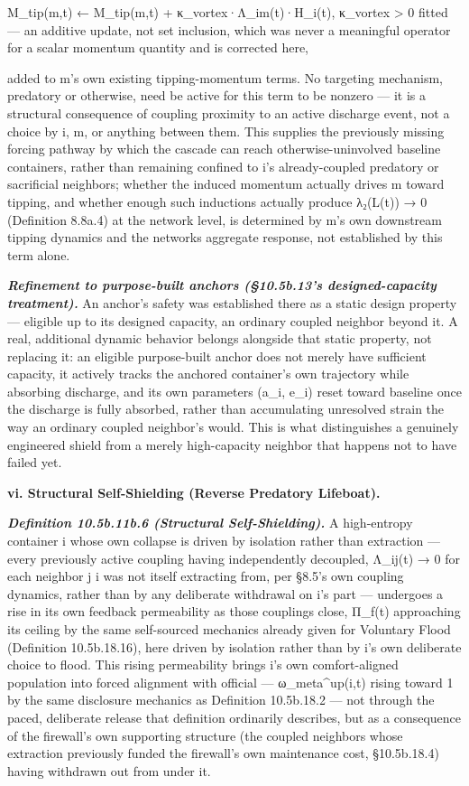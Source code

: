 \documentclass[
]{article}
\begin{document}
M\_tip(m,t) ← M\_tip(m,t) + κ\_vortex·Λ\_im(t)·H\_i(t), κ\_vortex
\textgreater{} 0 fitted --- an additive update, not set inclusion, which
was never a meaningful operator for a scalar momentum quantity and is
corrected here,

added to m's own existing tipping-momentum terms. No targeting
mechanism, predatory or otherwise, need be active for this term to be
nonzero --- it is a structural consequence of coupling proximity to an
active discharge event, not a choice by i, m, or anything between them.
This supplies the previously missing forcing pathway by which the
cascade can reach otherwise-uninvolved baseline containers, rather than
remaining confined to i's already-coupled predatory or sacrificial
neighbors; whether the induced momentum actually drives m toward
tipping, and whether enough such inductions actually produce λ₂(L(t)) →
0 (Definition 8.8a.4) at the network level, is determined by m's own
downstream tipping dynamics and the networks aggregate response, not
established by this term alone.

\emph{\textbf{Refinement to purpose-built anchors (§10.5b.13's
designed-capacity treatment).}} An anchor's safety was established there
as a static design property --- eligible up to its designed capacity, an
ordinary coupled neighbor beyond it. A real, additional dynamic behavior
belongs alongside that static property, not replacing it: an eligible
purpose-built anchor does not merely have sufficient capacity, it
actively tracks the anchored container's own trajectory while absorbing
discharge, and its own parameters (a\_i, e\_i) reset toward baseline
once the discharge is fully absorbed, rather than accumulating
unresolved strain the way an ordinary coupled neighbor's would. This is
what distinguishes a genuinely engineered shield from a merely
high-capacity neighbor that happens not to have failed yet.

\textbf{vi. Structural Self-Shielding (Reverse Predatory Lifeboat).}

\emph{\textbf{Definition 10.5b.11b.6 (Structural Self-Shielding).}} A
high-entropy container i whose own collapse is driven by isolation
rather than extraction  ---  every previously active coupling having
independently decoupled, Λ\_ij(t) → 0 for each neighbor j i was not
itself extracting from, per §8.5's own coupling dynamics, rather than
by any deliberate withdrawal on i's part  ---  undergoes a rise in its
own feedback permeability as those couplings close, Π\_f(t)
approaching its ceiling by the same self-sourced mechanics already
given for Voluntary Flood (Definition 10.5b.18.16), here driven by
isolation rather than by i's own deliberate choice to flood. This
rising permeability brings i's own comfort-aligned population into
forced alignment with official  ---  ω\_meta\^{}up(i,t) rising toward
1 by the same disclosure mechanics as Definition 10.5b.18.2  ---  not
through the paced, deliberate release that definition ordinarily
describes, but as a consequence of the firewall's own supporting
structure (the coupled neighbors whose extraction previously funded
the firewall's own maintenance cost, §10.5b.18.4) having withdrawn out
from under it.
\end{document}
